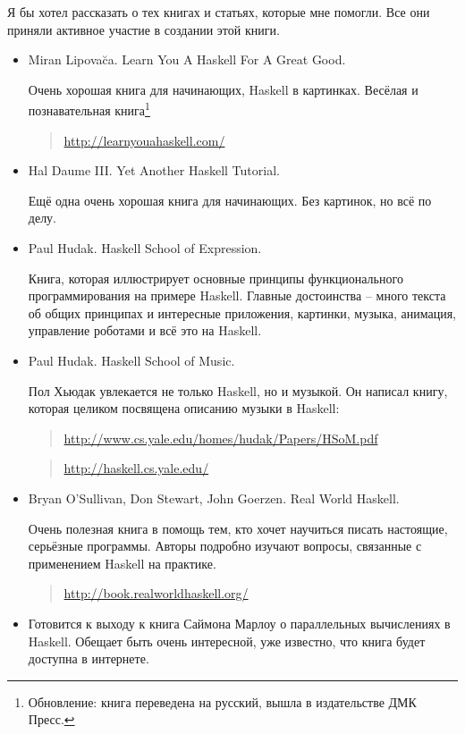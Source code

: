 Я бы хотел рассказать о тех книгах и статьях, которые мне помогли. Все
они приняли активное участие в создании этой книги.


\begin{itemize}
\item
  Miran Lipova\u{c}a. Learn You A Haskell For A Great Good.

  Очень хорошая книга для начинающих, Haskell в картинках. Весёлая и
  познавательная книга\footnote{Обновление: книга переведена на русский,
    вышла в издательстве ДМК Пресс.}

  \begin{quote}
  \url{http://learnyouahaskell.com/}
  \end{quote}
\item
  Hal Daume III. Yet Another Haskell Tutorial.

  Ещё одна очень хорошая книга для начинающих. Без картинок, но всё по
  делу.
\item
  Paul Hudak. Haskell School of Expression.

  Книга, которая иллюстрирует основные принципы функционального
  программирования на примере Haskell. Главные достоинства -- много
  текста об общих принципах и интересные приложения, картинки, музыка,
  анимация, управление роботами и всё это на Haskell.
\item
  Paul Hudak. Haskell School of Music.

  Пол Хьюдак увлекается не только Haskell, но и музыкой. Он написал
  книгу, которая целиком посвящена описанию музыки в Haskell:

  \begin{quote}
  \url{http://www.cs.yale.edu/homes/hudak/Papers/HSoM.pdf}
  \end{quote}

  \begin{quote}
  \url{http://haskell.cs.yale.edu/}
  \end{quote}
\item
  Bryan O'Sullivan, Don Stewart, John Goerzen. Real World Haskell.

  Очень полезная книга в помощь тем, кто хочет научиться писать
  настоящие, серьёзные программы. Авторы подробно изучают вопросы,
  связанные с применением Haskell на практике.

  \begin{quote}
  \url{http://book.realworldhaskell.org/}
  \end{quote}
\item
  Готовится к выходу к книга Саймона Марлоу о параллельных вычислениях в
  Haskell. Обещает быть очень интересной, уже известно, что книга будет
  доступна в интернете.
\end{itemize}

